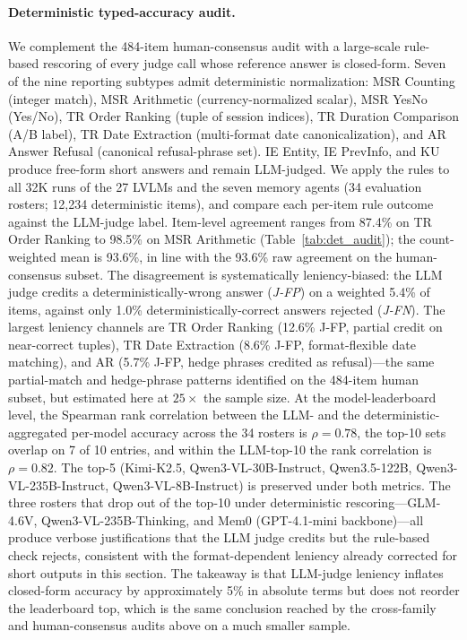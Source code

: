 \documentclass{llmxive}
\begin{document}
\paragraph{Deterministic typed-accuracy audit.}
We complement the 484-item human-consensus audit with a large-scale rule-based rescoring of every judge call whose reference answer is closed-form. Seven of the nine reporting subtypes admit deterministic normalization: MSR Counting (integer match), MSR Arithmetic (currency-normalized scalar), MSR YesNo (Yes/No), TR Order Ranking (tuple of session indices), TR Duration Comparison (A/B label), TR Date Extraction (multi-format date canonicalization), and AR Answer Refusal (canonical refusal-phrase set). IE Entity, IE PrevInfo, and KU produce free-form short answers and remain LLM-judged. We apply the rules to all 32K runs of the 27 LVLMs and the seven memory agents (34 evaluation rosters; 12{,}234 deterministic items), and compare each per-item rule outcome against the LLM-judge label.
Item-level agreement ranges from 87.4\% on TR Order Ranking to 98.5\% on MSR Arithmetic (Table~\ref{tab:det_audit}); the count-weighted mean is 93.6\%, in line with the 93.6\% raw agreement on the human-consensus subset.
The disagreement is systematically leniency-biased: the LLM judge credits a deterministically-wrong answer (\textit{J-FP}) on a weighted 5.4\% of items, against only 1.0\% deterministically-correct answers rejected (\textit{J-FN}). The largest leniency channels are TR Order Ranking (12.6\% J-FP, partial credit on near-correct tuples), TR Date Extraction (8.6\% J-FP, format-flexible date matching), and AR (5.7\% J-FP, hedge phrases credited as refusal)---the same partial-match and hedge-phrase patterns identified on the 484-item human subset, but estimated here at $25{\times}$ the sample size.
At the model-leaderboard level, the Spearman rank correlation between the LLM- and the deterministic-aggregated per-model accuracy across the 34 rosters is $\rho = 0.78$, the top-10 sets overlap on 7 of 10 entries, and within the LLM-top-10 the rank correlation is $\rho = 0.82$. The top-5 (Kimi-K2.5, Qwen3-VL-30B-Instruct, Qwen3.5-122B, Qwen3-VL-235B-Instruct, Qwen3-VL-8B-Instruct) is preserved under both metrics. The three rosters that drop out of the top-10 under deterministic rescoring---GLM-4.6V, Qwen3-VL-235B-Thinking, and Mem0 (GPT-4.1-mini backbone)---all produce verbose justifications that the LLM judge credits but the rule-based check rejects, consistent with the format-dependent leniency already corrected for short outputs in this section. The takeaway is that LLM-judge leniency inflates closed-form accuracy by approximately 5\% in absolute terms but does not reorder the leaderboard top, which is the same conclusion reached by the cross-family and human-consensus audits above on a much smaller sample.
\end{document}
